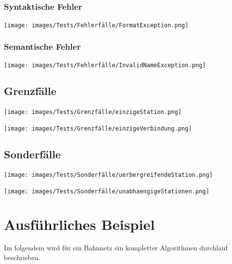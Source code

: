\subsubsection{Syntaktische Fehler}\label{test:sec:syntaktische-fehler}
\begin{center}
    \texttt{[image: images/Tests/Fehlerfälle/FormatException.png]}
    \label{test:subsecpar:format-fehler}
\end{center}

\subsubsection{Semantische Fehler}\label{test:sec:semantische-fehler}
\begin{center}
    \texttt{[image: images/Tests/Fehlerfälle/InvalidNameException.png]}
    \label{test:subsecpar:namen-sind-nicht-erlaubt}
\end{center}

\subsection{Grenzfälle}\label{test:sec:grenzfaelle}

\begin{center}
    \texttt{[image: images/Tests/Grenzfälle/einzigeStation.png]}
    \label{test:subsecpar:einzige-station}
\end{center}

\begin{center}
    \texttt{[image: images/Tests/Grenzfälle/einzigeVerbindung.png]}
    \label{test:subsecpar:einzige}
\end{center}


\subsection{Sonderfälle}\label{test:sec:sonderfaelle}

\begin{center}
    \texttt{[image: images/Tests/Sonderfälle/uerbergreifendeStation.png]}
    \label{test:subsecpar:uerbergreifendeStation}
\end{center}

\begin{center}
    \texttt{[image: images/Tests/Sonderfälle/unabhaengigeStationen.png]}
    \label{test:subsecpar:unabhaengigeStationen}
\end{center}


\section{Ausführliches Beispiel}\label{test:sec:ausfuehrliches-beispiel}
Im folgendem wird für ein Bahnnetz ein kompletter Algorithmen durchlauf beschrieben.\\

